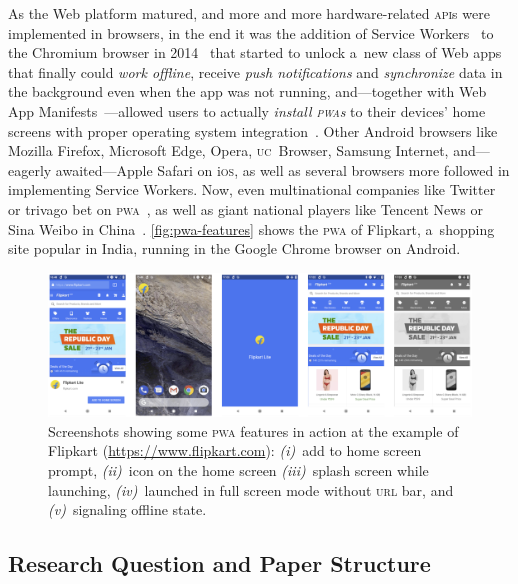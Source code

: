 \documentclass[sigconf]{acmart}
\begin{document}
As the Web platform matured, and more and more
hardware-related \textsc{api}s were implemented in browsers,
in the end it was the addition of Service Workers~\cite{russell2017serviceworkers}
to the Chromium browser in 2014~\cite{cooney2014chromium} that started to unlock a~new class of Web apps
that finally could \emph{work offline}, receive \emph{push notifications}
and \emph{synchronize} data in the background even when the app was not running,
and---together with Web App Manifests~\cite{caceres2017manifest}---allowed
users to actually \emph{install \textsc{pwa}s} to their devices' home screens
with proper operating system integration~\cite{kinlan2017a2hs}.
Other Android browsers like Mozilla Firefox, Microsoft Edge, Opera, \textsc{uc}~Browser, Samsung Internet,
and---eagerly awaited---Apple Safari on i\textsc{os},
as well as several browsers more followed in implementing Service Workers.
Now, even multinational companies like Twitter
or trivago bet on \textsc{pwa}~\cite{gallagher2017twitterlite,twg2017trivago},
as well as giant national players like Tencent News or Sina Weibo in China~\cite{zhu2017pwa}.
\autoref{fig:pwa-features} shows the \textsc{pwa} of Flipkart, a~shopping site popular in India,
running in the Google Chrome browser on Android.

\begin{figure}[hbt]
  \centering
  \includegraphics[width=\columnwidth]{pwa-features}
  \caption[Screenshots showing some \textsc{pwa} features]{
    Screenshots showing some \textsc{pwa} features in action
    at the example of Flipkart (\url{https://www.flipkart.com}):
    \emph{(i)}~add to home screen prompt, \emph{(ii)}~icon on the home screen
    \emph{(iii)}~splash screen while launching,
    \emph{(iv)}~launched in full screen mode without \textsc{url} bar, and
    \emph{(v)}~signaling offline state.}
  \label{fig:pwa-features}
\end{figure}

\subsection{Research Question and Paper Structure}
\end{document}
